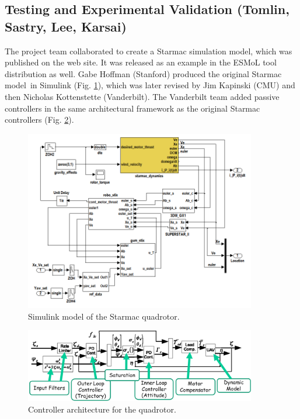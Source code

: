 \subsection{Testing and Experimental Validation (Tomlin, Sastry, Lee, Karsai)}


The project team collaborated to create a Starmac simulation model, which was published on the web site. It was released as an example in the ESMoL tool distribution as well\cite{jp_esmol}.  Gabe Hoffman (Stanford) produced the original Starmac model in Simulink (Fig. \ref{fig:starmac_mdl}), which was later revised by Jim Kapinski (CMU) and then Nicholas Kottenstette (Vanderbilt).  The Vanderbilt team added passive controllers in the same architectural framework 
as the original Starmac controllers (Fig. \ref{fig:starmac_arch}).

\begin{figure}[thpb]
\centering
\includegraphics[width=0.9\textwidth]{img/real_quadrotor_mdl.png}
\caption{Simulink model of the Starmac quadrotor.}
\label{fig:starmac_mdl}
\end{figure}

\begin{figure}[thpb]
\centering
\includegraphics[width=0.9\textwidth]{img/quadrotor_arch.png}
\caption{Controller architecture for the quadrotor.}
\label{fig:starmac_arch}
\end{figure}

